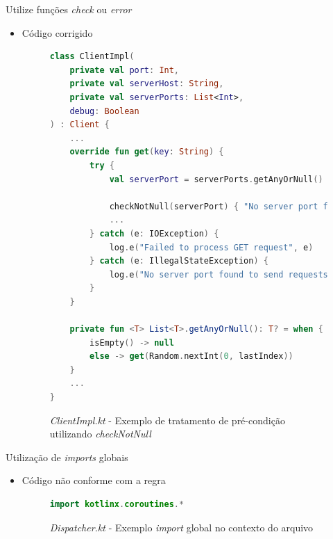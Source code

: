 \documentclass[brazilian]{beamer}
\begin{document}
\begin{frame}[fragile]{Utilize funções \textit{check} ou \textit{error}}
    \begin{itemize}
        \item Código corrigido
        \begin{figure}[H]
            \centering
            \begin{lstlisting}[language=Kotlin]
class ClientImpl(
    private val port: Int,
    private val serverHost: String,
    private val serverPorts: List<Int>,
    debug: Boolean
) : Client {
    ...
    override fun get(key: String) {
        try {
            val serverPort = serverPorts.getAnyOrNull()
            
            checkNotNull(serverPort) { "No server port found to send request" }
            ...
        } catch (e: IOException) {
            log.e("Failed to process GET request", e)
        } catch (e: IllegalStateException) {
            log.e("No server port found to send requests", e)
        }
    }

    private fun <T> List<T>.getAnyOrNull(): T? = when {
        isEmpty() -> null
        else -> get(Random.nextInt(0, lastIndex))
    }
    ...
}
            \end{lstlisting}
            \caption{\textit{ClientImpl.kt} - Exemplo de tratamento de pré-condição utilizando \textit{checkNotNull}}
            \label{fig:detekt_use_error_or_check_after_example}
        \end{figure}
    \end{itemize}
\end{frame}

\begin{frame}[fragile]{Utilização de \textit{imports} globais}
    \begin{itemize}
        \item Código não conforme com a regra
        \begin{figure}[H]
            \centering
            \begin{lstlisting}[language=Kotlin]
import kotlinx.coroutines.*
            \end{lstlisting}
            \caption{\textit{Dispatcher.kt} - Exemplo \textit{import} global no contexto do arquivo}
            \label{fig:detekt_wildcard_imports_before_example}
        \end{figure}
    \end{itemize}
\end{frame}
\end{document}
